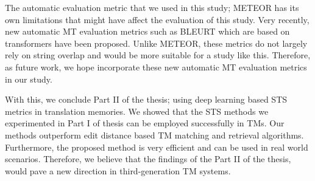 The automatic evaluation metric that we used in this study; METEOR has its own limitations that might have affect the evaluation of this study. Very recently, new automatic MT evaluation metrics such as BLEURT \autocite{sellam-etal-2020-bleurt} which are based on transformers have been proposed. Unlike METEOR, these metrics do not largely rely on string overlap and would be more suitable for a study like this. Therefore, as future work, we hope incorporate these new automatic MT evaluation metrics in our study.

With this, we conclude Part II of the thesis; using deep learning based STS metrics in translation memories. We showed that the STS methods we experimented in Part I of thesis can be employed successfully in TMs. Our methods outperform edit distance based TM matching and retrieval algorithms. Furthermore, the proposed method is very efficient and can be used in real world scenarios. Therefore, we believe that the findings of the Part II of the thesis, would pave a new direction in third-generation TM systems.

 

